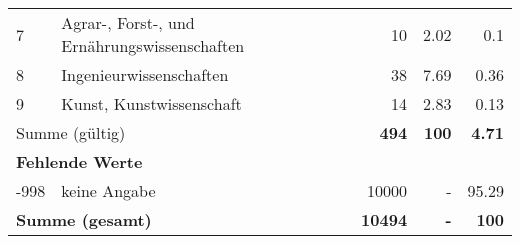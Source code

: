 \begin{longtable}{lXrrr}
     7 &
     \multicolumn{1}{X}{ Agrar-, Forst-, und Ernährungswissenschaften   } &


       \num{10} &
       \num[round-mode=places,round-precision=2]{2.02} &
         \num[round-mode=places,round-precision=2]{0.1} \\

     8 &
     \multicolumn{1}{X}{ Ingenieurwissenschaften   } &


       \num{38} &
       \num[round-mode=places,round-precision=2]{7.69} &
         \num[round-mode=places,round-precision=2]{0.36} \\

     9 &
     \multicolumn{1}{X}{ Kunst, Kunstwissenschaft   } &


       \num{14} &
       \num[round-mode=places,round-precision=2]{2.83} &
         \num[round-mode=places,round-precision=2]{0.13} \\
     \midrule
     \multicolumn{2}{l}{Summe (gültig)} &
       \textbf{\num{494}} &
     \textbf{\num{100}} &
       \textbf{\num[round-mode=places,round-precision=2]{4.71}} \\
     \multicolumn{5}{l}{\textbf{Fehlende Werte}}\\
       -998 &
       keine Angabe &
         \num{10000} &
        - &
         \num[round-mode=places,round-precision=2]{95.29} \\
     \midrule
     \multicolumn{2}{l}{\textbf{Summe (gesamt)}} &
          \textbf{\num{10494}} &
        \textbf{-} &
        \textbf{\num{100}} \\
     \bottomrule
     \end{longtable}
     
